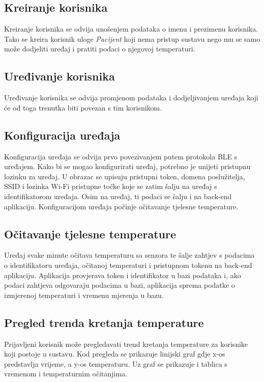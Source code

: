 \documentclass[times, utf8, diplomski]{fer}
\begin{document}
\subsection{Kreiranje korisnika}
Kreiranje korisnika se odvija unošenjem podataka o imenu i prezimenu korisnika. Tako se kreira korisnik uloge \emph{Pacijent} koji nema pristup sustavu nego mu se samo može dodjeliti uređaj i pratiti podaci o njegovoj temperaturi.

\subsection{Uređivanje korisnika}
Uređivanje korisnika se odvija promjenom podataka i dodjeljivanjem uređaja koji će od toga trenutka biti povezan s tim korisnikom.

\subsection{Konfiguracija uređaja}
Konfiguracija uređaja se odvija prvo povezivanjem putem protokola BLE s uređajem. Kako bi se mogao konfigurirati uređaj, potrebno je unijeti pristupnu lozinku za uređaj. U obrazac se upisuju pristupni token, domena poslužitelja, SSID i lozinka Wi-Fi pristupne točke koje se zatim šalju na uređaj s identifikatorom uređaja. Osim na uređaj, ti podaci se šalju i na back-end aplikaciju. Konfiguracijom uređaja počinje očitavanje tjelesne temperature.

\subsection{Očitavanje tjelesne temperature}
Uređaj svake minute očitava temperaturu sa senzora te šalje zahtjev s podacima o identifikatoru uređaja, očitanoj temperaturi i pristupnom tokenu na back-end aplikaciju. Aplikacija provjerava token i identifikator u bazi podataka i, ako podaci zahtjeva odgovaraju podacima u bazi, aplikacija sprema podatke o izmjerenoj temperaturi i vremenu mjerenja u bazu.

\subsection{Pregled trenda kretanja temperature}
Prijavljeni korisnik može pregledavati trend kretanja temperature za korisnike koji postoje u sustavu. Kod pregleda se prikazuje linijski graf gdje x-os predstavlja vrijeme, a y-os temperaturu. Uz graf se prikazuje i tablica s vremenom i temperaturnim očitanjima.
\end{document}
